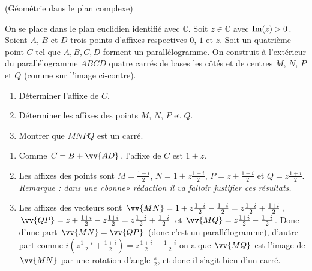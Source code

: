 \documentclass[a4paper,12pt,reqno]{amsart}
\begin{document}
\begin{exo} (Géométrie dans le plan complexe)

  \begin{minipage}{.7\linewidth}\smallskip
    On se place dans le plan euclidien identifié avec $\mathbb{C}$. Soit $z \in \mathbb{C}$ avec $\operatorname{Im}(z)>0$. Soient $A$, $B$ et $D$ trois points d'affixes respectives $0$, $1$ et $z$. Soit un quatrième point $C$ tel que $A,B,C,D$ forment un parallélogramme. On construit à l'extérieur du parallélogramme $ABCD$ quatre carrés de bases les côtés et de centres $M$, $N$, $P$ et $Q$ (comme sur l'image ci-contre).
  \end{minipage}
  \begin{minipage}{.35\linewidth}
    \hfill
  \end{minipage}

  \begin{enumerate}
    \item Déterminer l'affixe de $C$.
    \item Déterminer les affixes des points $M$, $N$, $P$ et $Q$.
    \item Montrer que $MNPQ$ est un carré.
  \end{enumerate}

\end{exo}

\begin{solution}
  \begin{enumerate}
    \item Comme $C = B + \vv{AD}$, l'affixe de $C$ est $1+z$.
    \item Les affixes des points sont $M = \frac{1-i}{2}$, $N = 1+z\frac{1-i}{2}$, $P = z+\frac{1+i}{2}$ et $Q = z\frac{1+i}{2}$.\\
    \emph{Remarque : dans une «bonne» rédaction il va falloir justifier ces résultats.}
    \item Les affixes des vecteurs sont $\vv{MN} = 1+z\frac{1-i}{2} - \frac{1-i}{2} = z\frac{1-i}{2} + \frac{1+i}{2}$, $\vv{QP} = z+\frac{1+i}{2} - z\frac{1+i}{2} = z\frac{1-i}{2} + \frac{1+i}{2}$ et $\vv{MQ} = z\frac{1+i}{2} - \frac{1-i}{2}$. Donc d'une part $\vv{MN} = \vv{QP}$ (donc c'est un parallélogramme), d'autre part comme  $i\left(z\frac{1-i}{2} + \frac{1+i}{2}\right) = z\frac{1+i}{2} - \frac{1-i}{2}$ on a
    que $\vv{MQ}$ est l'image de $\vv{MN}$ par une rotation d'angle $\frac{\pi}{2}$, et donc il s'agit bien d'un carré.
  \end{enumerate}
\end{solution}
\end{document}
